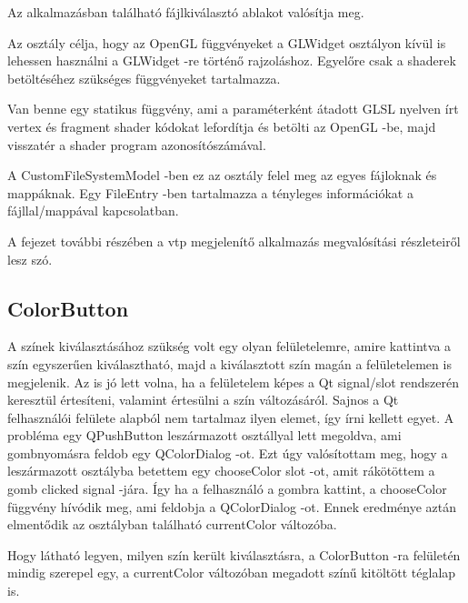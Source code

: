 \begin{description}[font=\normalfont\itshape\space]
\item [OpenFileDialog:]
Az alkalmazásban található fájlkiválasztó ablakot valósítja meg.
\item [OpenGLInterface:]
Az osztály célja, hogy az OpenGL függvényeket 
a {\ttfamily GLWidget} osztályon kívül is lehessen használni 
a {\ttfamily GLWidget} -re történő rajzoláshoz. 
Egyelőre csak a shaderek betöltéséhez 
szükséges függvényeket tartalmazza.
\item [ShaderLoader:]
Van benne egy statikus függvény, 
ami a paraméterként átadott GLSL nyelven írt vertex 
és fragment shader kódokat lefordítja és betölti az OpenGL -be, 
majd visszatér a shader program azonosítószámával.
\item [TreeItem:]
A {\ttfamily CustomFileSystemModel} -ben ez az osztály felel meg 
az egyes fájloknak és mappáknak.
Egy {\ttfamily FileEntry} -ben tartalmazza a tényleges információkat 
a fájllal/mappával kapcsolatban.
\end{description}

\noindent A fejezet további részében a vtp megjelenítő alkalmazás megvalósítási részleteiről lesz szó.

\subsection{ColorButton}

A színek kiválasztásához szükség volt egy olyan felületelemre, 
amire kattintva a szín egyszerűen kiválasztható, 
majd a kiválasztott szín magán a felületelemen is megjelenik. 
Az is jó lett volna, ha a felületelem képes a 
Qt signal/slot rendszerén keresztül értesíteni, 
valamint értesülni a szín változásáról. 
Sajnos a Qt felhasználói felülete alapból nem tartalmaz ilyen elemet, 
így írni kellett egyet. 
A probléma egy {\ttfamily QPushButton} leszármazott osztállyal lett megoldva, 
ami gombnyomásra feldob egy {\ttfamily QColorDialog} -ot. 
Ezt úgy valósítottam meg, 
hogy a leszármazott osztályba betettem 
egy {\ttfamily chooseColor} slot -ot, 
amit rákötöttem a gomb {\ttfamily clicked} signal -jára. 
Így ha a felhasználó a gombra kattint,
a {\ttfamily chooseColor} függvény hívódik meg,
ami feldobja a {\ttfamily QColorDialog} -ot.
Ennek eredménye aztán elmentődik 
az osztályban található {\ttfamily currentColor} változóba. 

Hogy látható legyen, 
milyen szín került kiválasztásra, 
a {\ttfamily ColorButton} -ra felületén mindig szerepel egy, 
a {\ttfamily currentColor} változóban megadott színű kitöltött téglalap is. 

